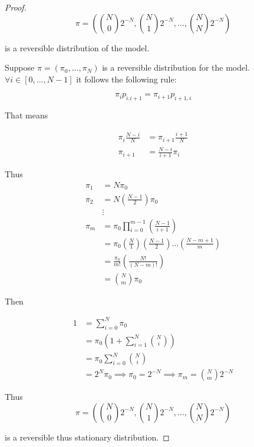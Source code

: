 \documentclass{article}
\begin{document}
\begin{proof}
    \[\pi = \left({N \choose 0} 2^{-N}, {N \choose 1} 2^{-N}, \dots, {N \choose N} 2^{-N}\right)\]
    
    is a reversible distribution of the model. 

    Suppose $\pi = (\pi_0, \dots, \pi_N)$ is a reversible distribution for the model. $\forall i \in [0, \dots, N - 1]$ it follows the following rule:
    
    \[\pi_{i} p_{i. i + 1} = \pi_{i + 1} p_{i + 1, i}\]

    That means 

    \begin{align*}
        \pi_{i} \frac{N - i}{N} &= \pi_{i + 1}\frac{i + 1}{N} \\
        \pi_{i + 1} &= \frac{N - i}{i + 1} \pi_i
    \end{align*}

    Thus \begin{align*}
        \pi_1 &= N \pi_0 \\
        \pi_2 &= N\left(\frac{N - 1}{2}\right)\pi_0 \\
        &\vdots\\
        \pi_m &= \pi_0 \prod_{i = 0}^{m - 1}\left(\frac{N - 1}{i + 1}\right) \\
        &= \pi_0 \left(\frac{N}{1}\right) \left(\frac{N - 1}{2}\right) \dots \left(\frac{N - m + 1}{m}\right) \\
        &= \frac{\pi_0}{m!} \left(\frac{N!}{\left(N - m\right)!}\right) \\
        &= {N \choose m} \pi_0
    \end{align*} 

    Then 

    \begin{align*}
        1 &= \sum_{i = 0}^N \pi_0\\
        &= \pi_0 \left(1 + \sum_{i = 1}^{N} {N \choose i}\right) \\
        &= \pi_0 \sum_{i = 0}^{N} {N \choose i} \\
        &= 2^{N} \pi_0 \implies \pi_0 = 2^{-N} \implies \pi_m = {N \choose m} 2^{-N} 
    \end{align*}

    Thus     \[\pi = \left({N \choose 0} 2^{-N}, {N \choose 1} 2^{-N}, \dots, {N \choose N} 2^{-N}\right)\]

    is a reversible thus stationary distribution.


\end{proof}
\end{document}
